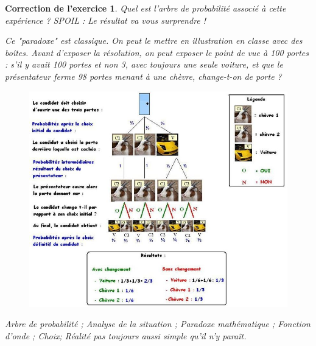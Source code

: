 \documentclass[12pt]{article}
\theoremstyle{break}
\newtheorem{cor}{Correction de l'exercice}
\begin{document}
\begin{cor}
\textit{Quel est l'arbre de probabilité associé à cette expérience ? SPOIL : Le résultat va vous surprendre !}

Ce "paradoxe" est classique. On peut le mettre en illustration en classe avec des boîtes. Avant d'exposer la résolution, on peut exposer le point de vue à 100 portes : s'il y avait 100 portes et non 3, avec toujours une seule voiture, et que le présentateur ferme 98 portes menant à une chèvre, change-t-on de porte ?\newline 
\begin{figure}[h!]
	\centering
    \includegraphics[width=1.1\textwidth]{SolutionMontyHall.JPG}
    
\end{figure}

\textit{Arbre de probabilité ; Analyse de la situation ; Paradoxe mathématique ; Fonction d'onde ; Choix; Réalité pas toujours aussi simple qu'il n'y paraît.}
\end{cor}
\end{document}

